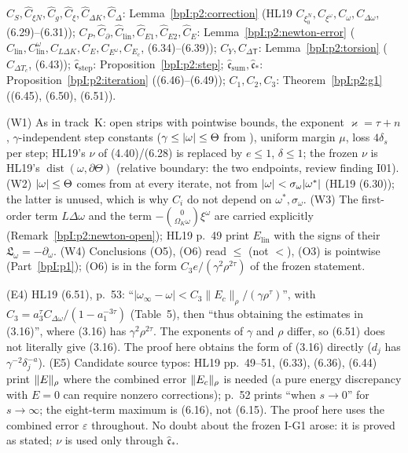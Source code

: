 \begin{remark}\label{bpI:p2:register}
$\hat C_S,\hat C_{\xi N},\hat C_g,\hat C_\xi,\hat C_{\Delta K},\hat C_\Delta$: Lemma~\ref{bpI:p2:correction} (HL19 $C_{\xi_0^N},C_{\xi^\omega},C_\omega,C_{\Delta\omega}$, (6.29)--(6.31)); $C_P,\hat C_\partial,\hat C_{\mathrm{lin}},\hat C_{E1},\hat C_{E2},\hat C_E$: Lemma~\ref{bpI:p2:newton-error} ($C_{\mathrm{lin}},C_{\mathrm{lin}}^\omega,C_{L\Delta K},C_E,C_{E^\omega},C_{E_c}$, (6.34)--(6.39)); $C_Y,C_{\Delta\mathsf T}$: Lemma~\ref{bpI:p2:torsion} ($C_{\Delta T_c}$, (6.43)); $\hat{\mathfrak c}_{\mathrm{step}}$: Proposition~\ref{bpI:p2:step}; $\hat{\mathfrak c}_{\mathrm{sum}},\hat{\mathfrak c}_*$: Proposition~\ref{bpI:p2:iteration} ((6.46)--(6.49)); $C_1,C_2,C_3$: Theorem~\ref{bpI:p2:g1} ((6.45), (6.50), (6.51)).
\end{remark}

\begin{remark}\label{bpI:p2:deviations}
(W1) As in track~K: open strips with pointwise bounds, the exponent $\varkappa=\tau+n$, $\gamma$-independent step constants ($\gamma\le\lvert \omega\rvert\le\Theta$ from ), uniform margin $\mu$, loss $4\delta_s$ per step; HL19's $\nu$ of (4.40)/(6.28) is replaced by $e\le1$, $\delta\le1$; the frozen $\nu$ is HL19's $\operatorname{dist}(\omega,\partial\Theta)$ (relative boundary: the two endpoints, review finding I01).
(W2) $\lvert \omega\rvert\le\Theta$ comes from  at every iterate, not from $\lvert \omega\rvert<\sigma_\omega\lvert \omega^*\rvert$ (HL19 (6.30)); the latter is unused, which is why $C_i$ do not depend on $\omega^*,\sigma_\omega$.
(W3) The first-order term $L\Delta\omega$ and the term $-\binom0{\Omega_K\omega}\xi^\omega$ are carried explicitly (Remark~\ref{bpI:p2:newton-open}); HL19 p.~49 print $E_{\mathrm{lin}}$ with the signs of their $\mathfrak L_\omega=-\partial_\omega$.
(W4) Conclusions (O5), (O6) read $\le$ (not $<$), (O3) is pointwise (Part~\ref{bpI:p1}); (O6) is in the form $C_3e/(\gamma^2\rho^{2\tau})$ of the frozen statement.
\end{remark}

\begin{remark}\label{bpI:p2:errata}
(E4) HL19 (6.51), p.~53: ``$|\omega_\infty-\omega|<C_3\|E_c\|_\rho/(\gamma\rho^\tau)$'', with $C_3=a_3^\tau C_{\Delta\omega}/(1-a_1^{-3\tau})$ (Table~5), then ``thus obtaining the estimates in (3.16)'', where (3.16) has $\gamma^2\rho^{2\tau}$. The exponents of $\gamma$ and $\rho$ differ, so (6.51) does not literally give (3.16). The proof here obtains the form of (3.16) directly ($d_j$ has $\gamma^{-2}\delta_j^{-a}$). (E5) Candidate source typos: HL19 pp.~49--51, (6.33), (6.36), (6.44) print $\lVert E\rVert_\rho$ where the combined error $\lVert E_c\rVert_\rho$ is needed (a pure energy discrepancy with $E=0$ can require nonzero corrections); p.~52 prints ``when $s\to0$'' for $s\to\infty$; the eight-term maximum is (6.16), not (6.15). The proof here uses the combined error $\varepsilon$ throughout. No doubt about the frozen I-G1 arose: it is proved as stated; $\nu$ is used only through $\hat{\mathfrak c}_*$.
\end{remark}
